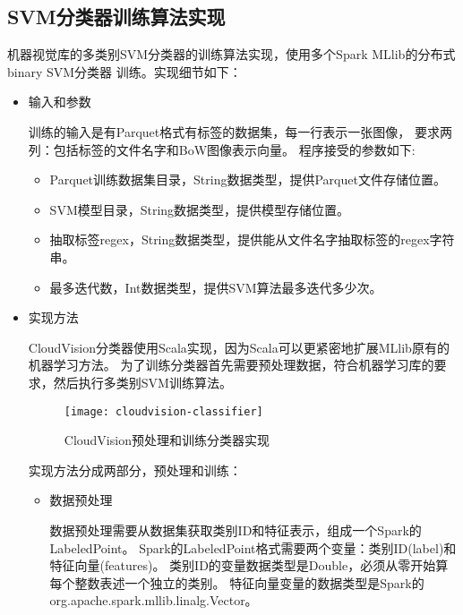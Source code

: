 \subsection{SVM分类器训练算法实现}
\label{subsec:classifier-training}
机器视觉库的多类别SVM分类器的训练算法实现，使用多个Spark MLlib的分布式binary SVM分类器
训练。实现细节如下：
\begin{itemize}
  \item 输入和参数

        训练的输入是有Parquet格式有标签的数据集，每一行表示一张图像，
        要求两列：包括标签的文件名字和BoW图像表示向量。
        程序接受的参数如下:
        \begin{itemize}
          \item Parquet训练数据集目录，String数据类型，提供Parquet文件存储位置。
          \item SVM模型目录，String数据类型，提供模型存储位置。
          \item 抽取标签regex，String数据类型，提供能从文件名字抽取标签的regex字符串。
          \item 最多迭代数，Int数据类型，提供SVM算法最多迭代多少次。
        \end{itemize}
        
  \item 实现方法

        CloudVision分类器使用Scala实现，因为Scala可以更紧密地扩展MLlib原有的机器学习方法。
        为了训练分类器首先需要预处理数据，符合机器学习库的要求，然后执行多类别SVM训练算法。


        \begin{figure}[h]
          \centering
            \texttt{[image: cloudvision-classifier]}
          \caption{CloudVision预处理和训练分类器实现}
          \label{fig:cloudvision-classifier}
        \end{figure}

        实现方法分成两部分，预处理和训练：
        \begin{itemize}
    
            \item 数据预处理

            数据预处理需要从数据集获取类别ID和特征表示，组成一个Spark的LabeledPoint。
            Spark的LabeledPoint格式需要两个变量：类别ID(label)和特征向量(features)。
            类别ID的变量数据类型是Double，必须从零开始算每个整数表述一个独立的类别。
            特征向量变量的数据类型是Spark的org.apache.spark.mllib.linalg.Vector。


\end{itemize}
\end{itemize}
